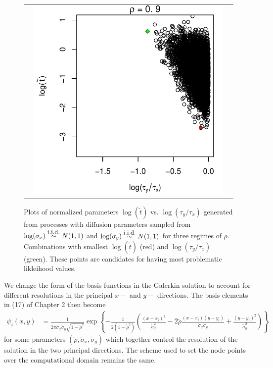 \documentclass[10pt]{article}
\begin{document}
\begin{enumerate}
\begin{figure}
\begin{tabular}{ccc}
\begin{minipage}{0.3\textwidth}
    \end{minipage}
    & \begin{minipage}{0.3\textwidth}
      \centering
      \includegraphics[width=1\linewidth]{small-sigma-t-scatterplot-09.pdf}
    \end{minipage}
  \end{tabular}
  \caption{Plots of normalized parameters $\log(\tilde{t})$
    vs. $\log(\tau_y/\tau_x)$ generated from processes with diffusion
    parameters sampled from
    $\log(\sigma_x) \overset{\mbox{\small i.i.d.}}{\sim} N(1,1)$ and
    $\log(\sigma_y) \overset{\mbox{\small i.i.d.}}{\sim} N(1,1)$ for
    three regimes of $\rho$. Combinations with smallest
    $\log(\tilde{t})$ (red) and $\log(\tau_y/\tau_x)$ (green). These
    points are candidates for having most problematic likleihood
    values.}
  \label{fig:small-sigma-y-t-samples}
\end{figure}
  We change the form of the basis functions in the Galerkin solution
  to account for different resolutions in the principal $x-$ and $y-$
  directions. The basis elements in (17) of Chapter 2 then become
  \begin{align}
    \psi_i(x,y) &= \frac{1}{2\pi \tilde{\sigma}_x \tilde{\sigma}_y \sqrt{1-\tilde{\rho}^2}}  \exp\left\{ -\frac{1}{2(1-\tilde{\rho}^2)} \left( \frac{(x - x_i)^2}{\tilde{\sigma}_x^2} - 2\tilde{\rho} \frac{(x-x_i)(y-y_i)}{\tilde{\sigma}_x\tilde{\sigma}_y} +  \frac{(y - y_i)^2}{\tilde{\sigma}_y^2}  \right)  \right\}
\end{align}
for some parameters
$(\tilde{\rho}, \tilde{\sigma}_x, \tilde{\sigma}_y)$ which together
control the resolution of the solution in the two principal
directions. The scheme used to set the node points over the
computational domain remains the same.


\end{enumerate}
\end{document}
